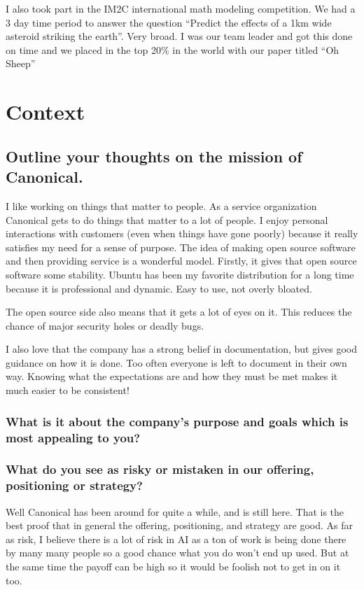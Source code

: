 \documentclass[letter,12pt]{article}
\begin{document}
I also took part in the IM2C international math modeling competition. We had a 3 day time period to answer the question ``Predict the effects of a 1km wide asteroid striking the earth''. Very broad. I was our team leader and got this done on time and we placed in the top 20\% in the world with our paper titled ``Oh Sheep''

\section{Context}


\subsection{Outline your thoughts on the mission of Canonical.}
I like working on things that matter to people. As a service organization Canonical gets to do things that matter to a lot of people. I enjoy personal interactions with customers (even when things have gone poorly) because it really satisfies my need for a sense of purpose. The idea of making open source software and then providing service is a wonderful model. Firstly, it gives that open source software some stability. Ubuntu has been my favorite distribution for a long time because it is professional and dynamic. Easy to use, not overly bloated.

The open source side also means that it gets a lot of eyes on it. This reduces the chance of major security holes or deadly bugs.

I also love that the company has a strong belief in documentation, but gives good guidance on how it is done. Too often everyone is left to document in their own way. Knowing what the expectations are and how they must be met makes it much easier to be consistent!

\subsubsection{What is it about the company's purpose and goals which is most appealing to you?}

\subsubsection{What do you see as risky or mistaken in our offering, positioning or strategy?}
Well Canonical has been around for quite a while, and is still here. That is the best proof that in general the offering, positioning, and strategy are good. As far as risk, I believe there is a lot of risk in AI as a ton of work is being done there by many many people so a good chance what you do won't end up used. But at the same time the payoff can be high so it would be foolish not to get in on it too.
\end{document}
